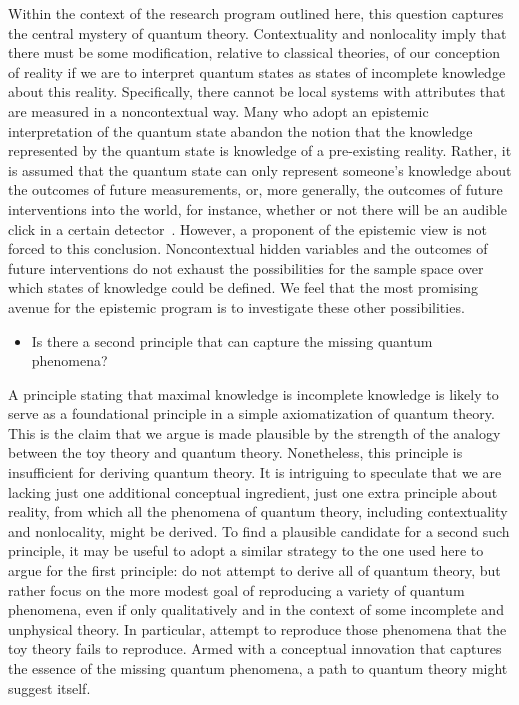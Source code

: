 \documentclass[pra,nofootinbib,showpacs,12pt]{revtex4}
\begin{document}
Within the context of the research program outlined here, this
question captures the central mystery of quantum theory.
Contextuality and nonlocality imply that there must be some
modification, relative to classical theories, of our conception of
reality if we are to interpret quantum states as states of
incomplete knowledge about this reality. Specifically, there
cannot be local systems with attributes that are measured in a
noncontextual way. Many who adopt an epistemic interpretation of
the quantum state abandon the notion that the knowledge
represented by the quantum state is knowledge of a pre-existing
reality. Rather, it is assumed that the quantum state can only
represent someone's knowledge about the outcomes of future
measurements, or, more generally, the outcomes of future
interventions into the world, for instance, whether or not there
will be an audible click in a certain detector~\cite{Fuchs}.
However, a proponent of the epistemic view is not forced to this
conclusion. Noncontextual hidden variables and the outcomes of
future interventions do not exhaust the possibilities for the
sample space over which states of knowledge could be defined. We
feel that the most promising avenue for the epistemic program is
to investigate these other possibilities.

\begin{itemize}
\item Is there a second principle that can capture the missing quantum
phenomena?
\end{itemize}

\strut \strut A principle stating that maximal knowledge is incomplete
knowledge is likely to serve as a foundational principle in a simple
axiomatization of quantum theory. This is the claim that we argue is made
plausible by the strength of the analogy between the toy theory and quantum
theory. Nonetheless, this principle is insufficient for deriving quantum
theory. It is intriguing to speculate that we are lacking just one
additional conceptual ingredient, just one extra principle about reality,
from which all the phenomena of quantum theory, including contextuality and
nonlocality, might be derived. To find a plausible candidate for a second
such principle, it may be useful to adopt a similar strategy to the one used
here to argue for the first principle: do not attempt to derive all of
quantum theory, but rather focus on the more modest goal of reproducing a
variety of quantum phenomena, even if only qualitatively and in the context
of some incomplete and unphysical theory. In particular, attempt to
reproduce those phenomena that the toy theory fails to reproduce. Armed with
a conceptual innovation that captures the essence of the missing quantum
phenomena, a path to quantum theory might suggest itself.
\end{document}
